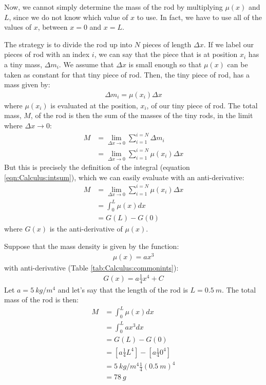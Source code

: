 Now, we cannot simply determine the mass of the rod by multiplying $\mu(x)$ and $L$, since we do not know which value of $x$ to use. In fact, we have to use all of the values of $x$, between $x=0$ and $x=L$. 

The strategy is to divide the rod up into $N$ pieces of length $\Delta x$. If we label our pieces of rod with an index $i$, we can say that the piece that is at position $x_i$ has a tiny mass, $\Delta m_i$. We assume that $\Delta x$ is small enough so that $\mu(x)$ can be taken as constant for that tiny piece of rod. Then, the tiny piece of rod, has a mass given by:
\begin{align*}
\Delta m_i = \mu(x_i) \Delta x
\end{align*}
where $\mu(x_i)$ is evaluated at the position, $x_i$, of our tiny piece of rod. The total mass, $M$, of the rod is then the sum of the masses of the tiny rods, in the limit where $\Delta x\to 0$:
\begin{align*}
M &= \lim_{\Delta x\to 0}\sum_{i=1}^{i=N}\Delta m_i \\
  &= \lim_{\Delta x\to 0}\sum_{i=1}^{i=N} \mu(x_i) \Delta x
\end{align*}
But this is precisely the definition of the integral (equation \ref{eqn:Calculus:intsum}), which we can easily evaluate with an anti-derivative:
\begin{align*}
M &=\lim_{\Delta x\to 0}\sum_{i=1}^{i=N} \mu(x_i) \Delta x \\
  &= \int_0^L \mu(x) dx \\
  &= G(L) - G(0)
\end{align*}
where $G(x)$ is the anti-derivative of $\mu(x)$.

Suppose that the mass density is given by the function:
\begin{align*}
\mu(x)=ax^3
\end{align*}
with anti-derivative (Table \ref{tab:Calculus:commonints}):
\begin{align*}
G(x)=a\frac{1}{4}x^4 + C
\end{align*}
Let $a=\SI{5}{kg/m^4}$ and let's say that the length of the rod is $L=\SI{0.5}{m}$. The total mass of the rod is then:
\begin{align*}
M&=\int_0^L \mu(x) dx \\
&=\int_0^L ax^3 dx \\
&= G(L)-G(0)\\
&=\left[ a\frac{1}{4}L^4 \right] - \left[ a\frac{1}{4}0^4 \right]\\
&=\SI{5}{kg/m^4}\frac{1}{4}(\SI{0.5}{m})^4 \\
&=\SI{78}{g}\\
\end{align*}

